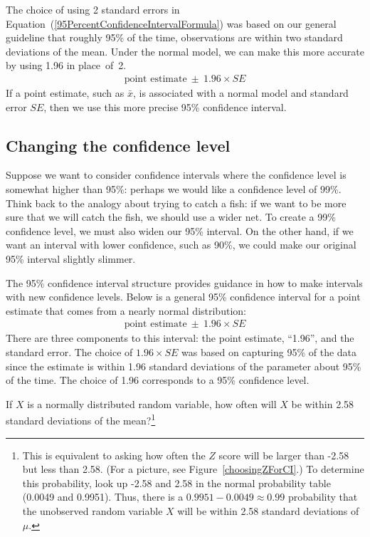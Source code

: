 The choice of using 2 standard errors in Equation~(\ref{95PercentConfidenceIntervalFormula}) was based on our general guideline that roughly 95\% of the time, observations are within two standard deviations of the mean. Under the normal model, we can make this more accurate by using 1.96 in place~of~2.
\begin{eqnarray}
\text{point estimate}\ \pm\ 1.96\times SE
\label{95PercentCIWhenUsingNormalModel}
\end{eqnarray}
If a point estimate, such as $\bar{x}$, is associated with a normal model and standard error $SE$, then we use this more precise 95\% confidence interval.


\subsection{Changing the confidence level}
\label{changingTheConfidenceLevelSection}


Suppose we want to consider confidence intervals where the confidence level is somewhat higher than 95\%: perhaps we would like a confidence level of 99\%. Think back to the analogy about trying to catch a fish: if we want to be more sure that we will catch the fish, we should use a wider net. To create a 99\% confidence level, we must also widen our 95\% interval. On the other hand, if we want an interval with lower confidence, such as 90\%, we could make our original 95\% interval slightly slimmer.

The 95\% confidence interval structure provides guidance in how to make intervals with new confidence levels. Below is a general 95\% confidence interval for a point estimate that comes from a nearly normal distribution:
\begin{eqnarray}
\text{point estimate}\ \pm\ 1.96\times SE
\end{eqnarray}
There are three components to this interval: the point estimate, ``1.96'', and the standard error. The choice of $1.96\times SE$ was based on capturing 95\% of the data since the estimate is within 1.96 standard deviations of the parameter about 95\% of the time. The choice of 1.96 corresponds to a 95\% confidence level. 

\begin{exercise} \label{leadInForMakingA99PercentCIExercise}
If $X$ is a normally distributed random variable, how often will $X$ be within 2.58 standard deviations of the mean?\footnote{This is equivalent to asking how often the $Z$ score will be larger than -2.58 but less than 2.58. (For a picture, see Figure~\ref{choosingZForCI}.) To determine this probability, look up -2.58 and 2.58 in the normal probability table (0.0049 and 0.9951). Thus, there is a $0.9951-0.0049 \approx 0.99$ probability that the unobserved random variable $X$ will be within 2.58 standard deviations of $\mu$.}
\end{exercise}

